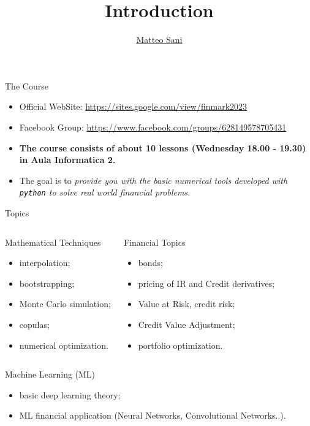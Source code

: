 \documentclass{beamer}
\title{Introduction}
\author{\href{mailto:matteo.sani@unisi.it}{Matteo Sani}}
\begin{document}
\begin{frame}[plain]
  \maketitle
\end{frame}

\begin{frame}{The Course}
  \begin{itemize}
  \item Official WebSite: \href{https://sites.google.com/view/finmark2023}{https://sites.google.com/view/finmark2023}
  \item Facebook Group: \href{https://www.facebook.com/groups/628149578705431}{https://www.facebook.com/groups/628149578705431}
  \item \textbf{The course consists of about 10 lessons (Wednesday 18.00 - 19.30) in Aula Informatica 2.}
  \item The goal is to \emph{provide you with the basic numerical tools developed with \texttt{python} to solve real world financial problems.}
  \end{itemize}
\end{frame}

\begin{frame}{Topics}
  \begin{columns}
    \begin{block}{Mathematical Techniques}
      \begin{itemize}
      \item interpolation;
      \item bootstrapping;
      \item Monte Carlo simulation;
      \item copulas;
      \item numerical optimization.
      \end{itemize}
    \end{block}
    \begin{block}{Financial Topics}
      \begin{itemize}
      \item bonds;
      \item pricing of IR and Credit derivatives;
      \item Value at Risk, credit risk;
      \item Credit Value Adjustment;
      \item portfolio optimization.
      \end{itemize}
    \end{block}
  \end{columns}
  \begin{block}{Machine Learning (ML)}
    \begin{itemize}
    \item basic deep learning theory;
    \item ML financial application (Neural Networks, Convolutional Networks..).
    \end{itemize}
  \end{block}
\end{frame}
\end{document}
